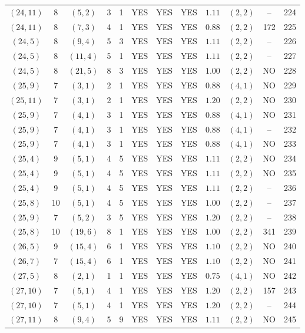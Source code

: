\begin{longtable}{|c|c|c|c|c|c|c|c|c|c|c|c|}
$(24,11)$ & 8 & $(5,2)$ & 3 & 1 & YES & YES & YES & $1.11$ & $(2,2)$ & -- & 224\\
$(24,11)$ & 8 & $(7,3)$ & 4 & 1 & YES & YES & YES & $0.88$ & $(2,2)$ & 172 & 225\\
$(24,5)$ & 8 & $(9,4)$ & 5 & 3 & YES & YES & YES & $1.11$ & $(2,2)$ & -- & 226\\
$(24,5)$ & 8 & $(11,4)$ & 5 & 1 & YES & YES & YES & $1.11$ & $(2,2)$ & -- & 227\\
$(24,5)$ & 8 & $(21,5)$ & 8 & 3 & YES & YES & YES & $1.00$ & $(2,2)$ & NO & 228\\
$(25,9)$ & 7 & $(3,1)$ & 2 & 1 & YES & YES & YES & $0.88$ & $(4,1)$ & NO & 229\\
$(25,11)$ & 7 & $(3,1)$ & 2 & 1 & YES & YES & YES & $1.20$ & $(2,2)$ & NO & 230\\
$(25,9)$ & 7 & $(4,1)$ & 3 & 1 & YES & YES & YES & $0.88$ & $(4,1)$ & NO & 231\\
$(25,9)$ & 7 & $(4,1)$ & 3 & 1 & YES & YES & YES & $0.88$ & $(4,1)$ & -- & 232\\
$(25,9)$ & 7 & $(4,1)$ & 3 & 1 & YES & YES & YES & $0.88$ & $(4,1)$ & NO & 233\\
$(25,4)$ & 9 & $(5,1)$ & 4 & 5 & YES & YES & YES & $1.11$ & $(2,2)$ & NO & 234\\
$(25,4)$ & 9 & $(5,1)$ & 4 & 5 & YES & YES & YES & $1.11$ & $(2,2)$ & NO & 235\\
$(25,4)$ & 9 & $(5,1)$ & 4 & 5 & YES & YES & YES & $1.11$ & $(2,2)$ & -- & 236\\
$(25,8)$ & 10 & $(5,1)$ & 4 & 5 & YES & YES & YES & $1.00$ & $(2,2)$ & -- & 237\\
$(25,9)$ & 7 & $(5,2)$ & 3 & 5 & YES & YES & YES & $1.20$ & $(2,2)$ & -- & 238\\
$(25,8)$ & 10 & $(19,6)$ & 8 & 1 & YES & YES & YES & $1.00$ & $(2,2)$ & 341 & 239\\
$(26,5)$ & 9 & $(15,4)$ & 6 & 1 & YES & YES & YES & $1.10$ & $(2,2)$ & NO & 240\\
$(26,7)$ & 7 & $(15,4)$ & 6 & 1 & YES & YES & YES & $1.10$ & $(2,2)$ & NO & 241\\
$(27,5)$ & 8 & $(2,1)$ & 1 & 1 & YES & YES & YES & $0.75$ & $(4,1)$ & NO & 242\\
$(27,10)$ & 7 & $(5,1)$ & 4 & 1 & YES & YES & YES & $1.20$ & $(2,2)$ & 157 & 243\\
$(27,10)$ & 7 & $(5,1)$ & 4 & 1 & YES & YES & YES & $1.20$ & $(2,2)$ & -- & 244\\
$(27,11)$ & 8 & $(9,4)$ & 5 & 9 & YES & YES & YES & $1.11$ & $(2,2)$ & NO & 245\\

\end{longtable}
